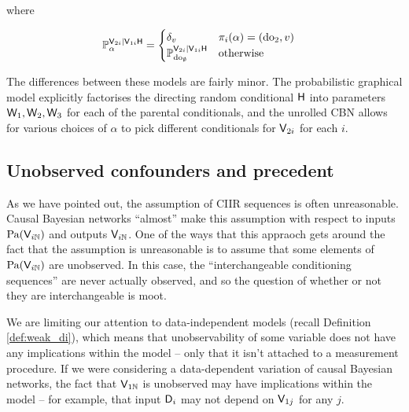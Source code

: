 where 

\begin{align}
    \mathbb{P}_\alpha^{\mathsf{V}_{2i}|\mathsf{V}_{1i}\mathsf{H}} &= \begin{cases}
        \delta_{v} & \pi_i(\alpha)=(\mathrm{do}_2,v)\\
        \mathbb{P}_{\mathrm{do}_{\emptyset}}^{\mathsf{V}_{2i}|\mathsf{V}_{1i}\mathsf{H}} & \text{otherwise}
    \end{cases}
\end{align}

The differences between these models are fairly minor. The probabilistic graphical model explicitly factorises the directing random conditional $\mathsf{H}$ into parameters $\mathsf{W}_1, \mathsf{W}_2, \mathsf{W}_3$ for each of the parental conditionals, and the unrolled CBN allows for various choices of $\alpha$ to pick different conditionals for $\mathsf{V}_{2i}$ for each $i$.

\subsection{Unobserved confounders and precedent}\label{sec:precedent}

As we have pointed out, the assumption of CIIR sequences is often unreasonable. Causal Bayesian networks ``almost'' make this assumption with respect to inputs $\text{Pa}(\mathsf{V}_{i\mathbb{N}})$ and outputs $\mathsf{V}_{i\mathbb{N}}$. One of the ways that this appraoch gets around the fact that the assumption is unreasonable is to assume that some elements of $\text{Pa}(\mathsf{V}_{i\mathbb{N}})$ are unobserved. In this case, the ``interchangeable conditioning sequences'' are never actually observed, and so the question of whether or not they are interchangeable is moot.

We are limiting our attention to data-independent models (recall Definition \ref{def:weak_di}), which means that unobservability of some variable does not have any implications within the model -- only that it isn't attached to a measurement procedure. If we were considering a data-dependent variation of causal Bayesian networks, the fact that $\mathsf{V}_{1\mathbb{N}}$ is unobserved may have implications within the model -- for example, that input $\mathsf{D}_i$ may not depend on $\mathsf{V}_{1j}$ for any $j$.

